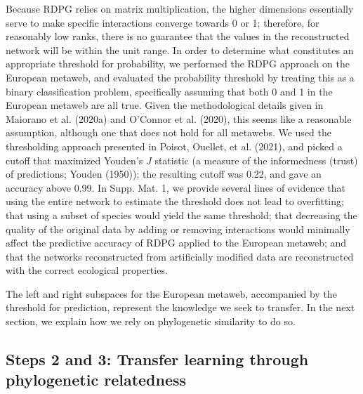 \documentclass[10pt,oneside]{article}
\begin{document}
Because RDPG relies on matrix multiplication, the higher dimensions
essentially serve to make specific interactions converge towards 0 or 1;
therefore, for reasonably low ranks, there is no guarantee that the
values in the reconstructed network will be within the unit range. In
order to determine what constitutes an appropriate threshold for
probability, we performed the RDPG approach on the European metaweb, and
evaluated the probability threshold by treating this as a binary
classification problem, specifically assuming that both 0 and 1 in the
European metaweb are all true. Given the methodological details given in
Maiorano et al. (2020a) and O'Connor et al. (2020), this seems like a
reasonable assumption, although one that does not hold for all metawebs.
We used the thresholding approach presented in Poisot, Ouellet, et al.
(2021), and picked a cutoff that maximized Youden's \(J\) statistic (a
measure of the informedness (trust) of predictions; Youden (1950)); the
resulting cutoff was 0.22, and gave an accuracy above 0.99. In Supp.
Mat. 1, we provide several lines of evidence that using the entire
network to estimate the threshold does not lead to overfitting; that
using a subset of species would yield the same threshold; that
decreasing the quality of the original data by adding or removing
interactions would minimally affect the predictive accuracy of RDPG
applied to the European metaweb; and that the networks reconstructed
from artificially modified data are reconstructed with the correct
ecological properties.

The left and right subspaces for the European metaweb, accompanied by
the threshold for prediction, represent the knowledge we seek to
transfer. In the next section, we explain how we rely on phylogenetic
similarity to do so.

\hypertarget{steps-2-and-3-transfer-learning-through-phylogenetic-relatedness}{%
\subsection{Steps 2 and 3: Transfer learning through phylogenetic
relatedness}\label{steps-2-and-3-transfer-learning-through-phylogenetic-relatedness}}
\end{document}
